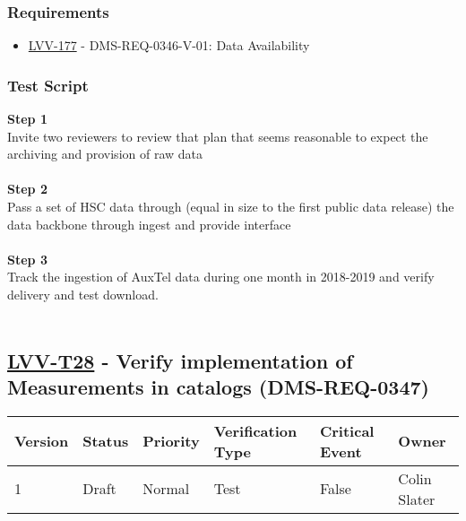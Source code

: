 \hypertarget{requirements-117}{%
\subsubsection{Requirements}\label{requirements-117}}

\begin{itemize}
\tightlist
\item
  \href{https://jira.lsstcorp.org/browse/LVV-177}{LVV-177} -
  DMS-REQ-0346-V-01: Data Availability
\end{itemize}

\hypertarget{test-script-117}{%
\subsubsection{Test Script}\label{test-script-117}}

\textbf{Step 1}\\
{Invite two reviewers to review that plan that seems reasonable to
expect the archiving and provision of raw data}\\
~\\
\textbf{Step 2}\\
Pass a set of HSC data through (equal in size to the first public data
release) the data backbone through ingest and provide interface\\
~\\
\textbf{Step 3}\\
Track the ingestion of AuxTel data during one month in 2018-2019 and
verify delivery and test download.\\
~\\

\hypertarget{lvv-t28---verify-implementation-of-measurements-in-catalogs-dms-req-0347}{%
\subsection{\texorpdfstring{\href{https://jira.lsstcorp.org/secure/Tests.jspa\#/testCase/LVV-T28}{LVV-T28}
- Verify implementation of Measurements in catalogs
(DMS-REQ-0347)}{LVV-T28 - Verify implementation of Measurements in catalogs (DMS-REQ-0347)}}\label{lvv-t28---verify-implementation-of-measurements-in-catalogs-dms-req-0347}}

\begin{longtable}[]{@{}llllll@{}}
\toprule
Version & Status & Priority & Verification Type & Critical Event &
Owner\tabularnewline
\midrule
\endhead
1 & Draft & Normal & Test & False & Colin Slater\tabularnewline
\bottomrule
\end{longtable}

